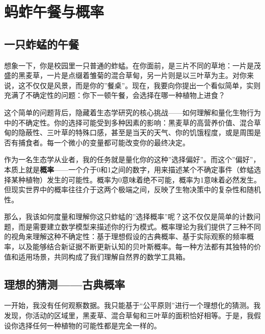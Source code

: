 \documentclass[
]{book}
\begin{document}
\hypertarget{ux8682ux86b1ux5348ux9910ux4e0eux6982ux7387}{%
\section{蚂蚱午餐与概率}\label{ux8682ux86b1ux5348ux9910ux4e0eux6982ux7387}}

\hypertarget{ux4e00ux53eaux86b1ux8722ux7684ux5348ux9910}{%
\subsection{一只蚱蜢的午餐}\label{ux4e00ux53eaux86b1ux8722ux7684ux5348ux9910}}

想象一下，你是校园里一只普通的蚱蜢。在你面前，是三片不同的草地：一片是茂盛的黑麦草，一片是点缀着雏菊的混合草甸，另一片则是以三叶草为主。对你来说，这不仅仅是风景，而是你的''餐桌''。现在，我要向你提出一个看似简单，实则充满了不确定性的问题：你下一顿午餐，会选择在哪一种植物上进食？

这个简单的问题背后，隐藏着生态学研究的核心挑战------如何理解和量化生物行为中的不确定性。你的选择可能受到多种因素的影响：黑麦草的高营养价值、混合草甸的隐蔽性、三叶草的特殊口感，甚至是当天的天气、你的饥饿程度，或是周围是否有捕食者。每一个微小的变量都可能改变你的最终决定。

作为一名生态学从业者，我的任务就是量化你的这种''选择偏好''。而这个''偏好''，本质上就是\textbf{概率}------一个介于0和1之间的数字，用来描述某个不确定事件（蚱蜢选择某种植物）发生的可能性。概率为0意味着绝不可能，概率为1意味着必然发生。但现实世界中的概率往往介于这两个极端之间，反映了生物决策中的复杂性和随机性。

那么，我该如何度量和理解你这只蚱蜢的''选择概率''呢？这不仅仅是简单的计数问题，而是需要建立数学模型来描述你的行为模式。概率理论为我们提供了三种不同的视角来理解这种不确定性：基于理想假设的古典概率、基于实际观察的频率概率，以及能够结合新证据不断更新认知的贝叶斯概率。每一种方法都有其独特的价值和适用场景，共同构成了我们理解自然界的数学工具箱。

\hypertarget{ux7406ux60f3ux7684ux731cux6d4bux53e4ux5178ux6982ux7387}{%
\subsection{理想的猜测------古典概率}\label{ux7406ux60f3ux7684ux731cux6d4bux53e4ux5178ux6982ux7387}}

一开始，我没有任何观察数据。我只能基于``公平原则''进行一个理想化的猜测。我发现，你活动的区域里，黑麦草、混合草甸和三叶草的面积恰好相等。于是，我假设你选择任何一种植物的可能性都是完全一样的。
\end{document}

